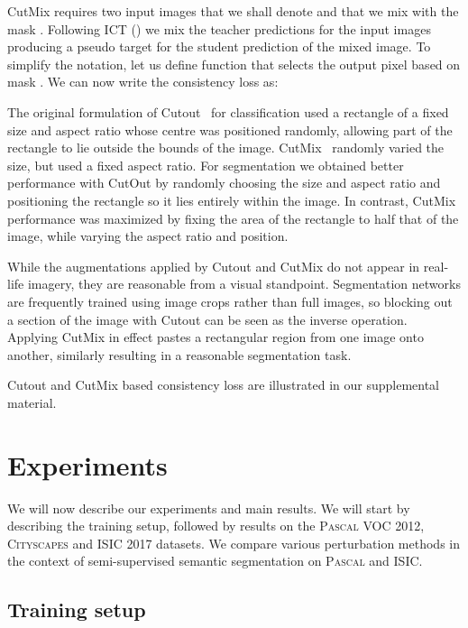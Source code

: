 \documentclass{bmvc2k}
\newcommand{\Cityscapes}{\textsc{Cityscapes}}
\newcommand{\Pascal}{\textsc{Pascal}}
\begin{document}
CutMix requires two input images that we shall denote  and  that we mix with the mask . Following ICT (\cite{Verma:ICT}) we mix the teacher predictions for the input images  producing a pseudo target
for the student prediction of the mixed image. To simplify the notation, let us
define function  that selects the output pixel based on mask .
We can now write the consistency loss as:


The original formulation of Cutout~\cite{Devries:Cutout} for classification used a rectangle of a fixed size and aspect ratio whose centre was positioned randomly,
allowing part of the rectangle to lie outside the bounds of the image. CutMix~\cite{Yun:CutMix} randomly varied the size, but used a fixed
aspect ratio. For segmentation we obtained better performance with CutOut by randomly choosing the size and aspect ratio and positioning the rectangle
so it lies entirely within the image. In contrast, CutMix performance was maximized by fixing the area of the rectangle to half that of the image, while
varying the aspect ratio and position.

While the augmentations applied by Cutout and CutMix do not appear in real-life imagery, they are reasonable from a visual standpoint.
Segmentation networks are frequently trained using image crops rather than full images, so blocking out a section of the image with Cutout can be seen as the inverse operation.
Applying CutMix in effect pastes a rectangular region from one image onto another, similarly resulting in a reasonable segmentation task.

Cutout and CutMix based consistency loss are illustrated in our supplemental material.





\section{Experiments}
\label{sec:experiments}

We will now describe our experiments and main results. We will start by describing the training setup, followed by results on the \Pascal{} VOC 2012, \Cityscapes{} and ISIC 2017 datasets.
We compare various perturbation methods in the context of semi-supervised semantic segmentation on \Pascal{} and ISIC.


\subsection{Training setup}
\label{sec:consseg:arch}
\end{document}
